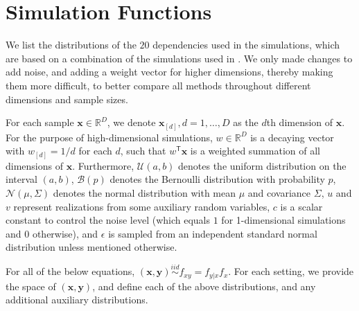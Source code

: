 \documentclass[11pt]{article}
\providecommand{\mb}[1]{\boldsymbol{#1}}
\providecommand{\mc}[1]{\mathcal{#1}}
\newcommand{\Real}{\mathbb{R}}
\newcommand{\T}{^{\ensuremath{\mathsf{T}}}}           %
\newcommand{\mbx}{\ensuremath{\mb{x}}}
\newcommand{\mby}{\ensuremath{\mb{y}}}
\begin{document}
\clearpage
\appendix
\setcounter{figure}{0}
\renewcommand\thefigure{A\arabic{figure}}

\section{Simulation Functions}
\label{appen:function}

We list the distributions of the $20$ dependencies used in the simulations, which are based on a combination of the simulations used in \cite{SzekelyRizzoBakirov2007, SimonTibshirani2012, SimonTibshirani2012, GorfineHellerHeller2012}.  We only made changes to add noise, and adding a weight vector for higher dimensions, thereby making them more difficult, to better compare all methods throughout different dimensions and sample sizes.

For each sample $\mbx \in \Real^{D}$, we denote $\mbx_{[d]}, d=1,\ldots,D$ as the $d$th dimension of \mbx. For the purpose of high-dimensional simulations, $w \in \Real^{D}$ is a decaying vector with $w_{[d]}=1/d$ for each $d$, such that $w\T \mbx$ is a 
weighted summation of all dimensions of \mbx. %
Furthermore, $\mc{U}(a,b)$ denotes the uniform distribution on the interval $(a,b)$, $\mc{B}(p)$ denotes the Bernoulli distribution with probability $p$, $\mc{N}(\mu,{\Sigma})$ denotes the normal distribution with mean ${\mu}$ and covariance ${\Sigma}$, 
$u$ and $v$ represent realizations from some auxiliary random variables, $c$ is a scalar constant to control the noise level (which equals $1$ for 1-dimensional simulations and $0$ otherwise), and $\epsilon$ is sampled from an independent standard normal distribution unless mentioned otherwise.

For all of the below equations, $(\mbx,\mby) \overset{iid}{\sim} f_{xy} = f_{y|x} f_x$. For each setting, we provide the space of $(\mbx,\mby)$, and define each of the above distributions, and any additional auxiliary distributions.
\end{document}
